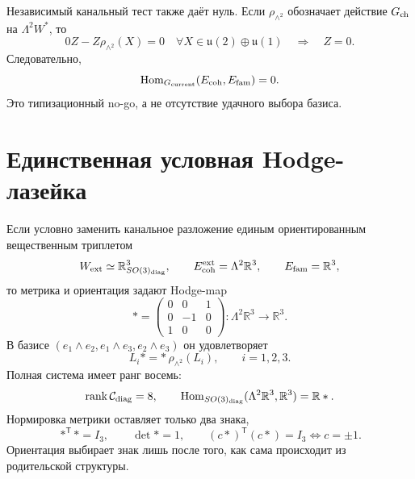 Независимый канальный тест также даёт нуль. Если
$\rho_{\wedge^2}$ обозначает действие $G_{\rm ch}$ на
$\Lambda^2W^*$, то
\begin{equation}
 0Z-Z\rho_{\wedge^2}(X)=0
 \quad\forall X\in\mathfrak u(2)\oplus\mathfrak u(1)
 \quad\Longrightarrow\quad Z=0.
 \label{eq:v8-coherence-family-current-channel-hom}
\end{equation}
Следовательно,
\begin{equation}
 \operatorname{Hom}_{G_{\rm current}}(E_{\rm coh},E_{\rm fam})=0.
 \label{eq:v8-coherence-family-current-product-hom}
\end{equation}
Это типизационный no-go, а не отсутствие удачного выбора базиса.

\section{Единственная условная Hodge-лазейка}

Если условно заменить канальное разложение единым ориентированным
вещественным триплетом
\begin{equation}
 W_{\rm ext}\simeq\mathbb R^3_{SO(3)_{\rm diag}},
 \qquad
 E_{\rm coh}^{\rm ext}=\Lambda^2\mathbb R^3,
 \qquad
 E_{\rm fam}=\mathbb R^3,
 \label{eq:v8-coherence-family-promoted-types}
\end{equation}
то метрика и ориентация задают Hodge-map
\begin{equation}
 *=\begin{pmatrix}
 0&0&1\\
 0&-1&0\\
 1&0&0
 \end{pmatrix}:
 \Lambda^2\mathbb R^3\longrightarrow\mathbb R^3.
 \label{eq:v8-coherence-family-hodge-map}
\end{equation}
В базисе $(e_1\wedge e_2,e_1\wedge e_3,e_2\wedge e_3)$ он удовлетворяет
\begin{equation}
 L_i*=*\,\rho_{\wedge^2}(L_i),
 \qquad i=1,2,3.
 \label{eq:v8-coherence-family-hodge-intertwining}
\end{equation}
Полная система имеет ранг восемь:
\begin{equation}
 \operatorname{rank}\mathcal C_{\rm diag}=8,
 \qquad
 \operatorname{Hom}_{SO(3)_{\rm diag}}
 (\Lambda^2\mathbb R^3,\mathbb R^3)=\mathbb R*.
 \label{eq:v8-coherence-family-promoted-hom}
\end{equation}
Нормировка метрики оставляет только два знака,
\begin{equation}
 *^{\mathsf T}*=I_3,
 \qquad
 \det *=1,
 \qquad
 (c*)^{\mathsf T}(c*)=I_3
 \Longleftrightarrow c=\pm1.
 \label{eq:v8-coherence-family-hodge-normalization}
\end{equation}
Ориентация выбирает знак лишь после того, как сама происходит из
родительской структуры.


